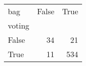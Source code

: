 \begin{tabular}{lrr}
\toprule
bag &  False &  True  \\
voting &        &        \\
\midrule
False  &     34 &     21 \\
True   &     11 &    534 \\
\bottomrule
\end{tabular}
